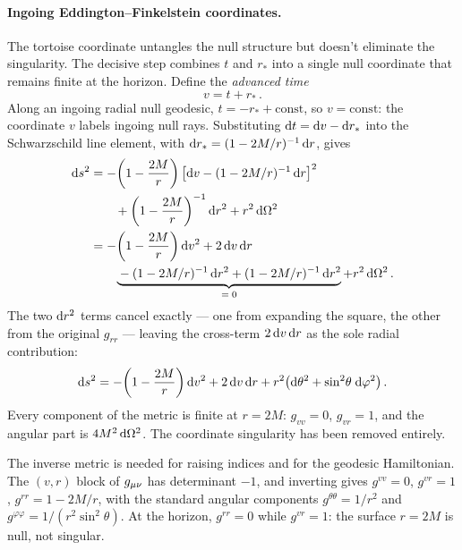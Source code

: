 \paragraph{Ingoing Eddington--Finkelstein coordinates.}

The tortoise coordinate untangles the null structure but doesn't
eliminate the singularity.  The decisive step combines $t$ and $r_*$
into a single null coordinate that remains finite at the horizon.
Define the \emph{advanced time}
%
\begin{equation}
  v = t + r_* \,.
  \label{eq:ef-v-def}
\end{equation}
%
Along an ingoing radial null geodesic, $t = -r_* + \text{const}$, so
$v = \text{const}$: the coordinate $v$ labels ingoing null rays.
Substituting $\mathrm{d} t = \mathrm{d} v - \mathrm{d} r_*$ into the Schwarzschild line
element, with $\mathrm{d} r_* = (1 - 2M/r)^{-1}\,\mathrm{d} r$, gives
%
\begin{align}
  \mathrm{d} s^2 &= -\!\left(1 - \frac{2M}{r}\right)
    \bigl[\mathrm{d} v - (1 - 2M/r)^{-1}\,\mathrm{d} r\bigr]^2
    \notag \\
    &\qquad
    + \left(1 - \frac{2M}{r}\right)^{-1}\mathrm{d} r^2
    + r^2\,\mathrm{d}\Omega^2 \notag \\
  &= -\!\left(1 - \frac{2M}{r}\right)\mathrm{d} v^2
    + 2\,\mathrm{d} v\,\mathrm{d} r \notag \\
    &\qquad
    \underbrace{{}- (1 - 2M/r)^{-1}\,\mathrm{d} r^2
    + (1 - 2M/r)^{-1}\,\mathrm{d} r^2}_{= \; 0}
    + r^2\,\mathrm{d}\Omega^2 \,.
    \label{eq:ef-substitution}
\end{align}
%
The two $\mathrm{d} r^2$ terms cancel exactly --- one from expanding the
square, the other from the original $g_{rr}$ --- leaving the
cross-term $2\,\mathrm{d} v\,\mathrm{d} r$ as the sole radial contribution:
%
\begin{equation}
  \mathrm{d} s^2 = -\!\left(1 - \frac{2M}{r}\right)\mathrm{d} v^2
           + 2\,\mathrm{d} v\,\mathrm{d} r
           + r^2\!\left(\mathrm{d}\theta^2
             + \sin^2\!\theta\;\mathrm{d}\varphi^2\right) .
  \label{eq:ef-ingoing}
\end{equation}
%
Every component of the metric is finite at $r = 2M$: $g_{vv} = 0$,
$g_{vr} = 1$, and the angular part is $4M^2\,\mathrm{d}\Omega^2$.  The
coordinate singularity has been removed entirely.

The inverse metric is needed for raising indices and for the geodesic
Hamiltonian.  The $(v, r)$ block of $g_{\mu\nu}$ has determinant $-1$,
and inverting gives $g^{vv} = 0$, $g^{vr} = 1$,
$g^{rr} = 1 - 2M/r$, with the standard angular components
$g^{\theta\theta} = 1/r^2$ and
$g^{\varphi\varphi} = 1/(r^2\sin^2\!\theta)$.  At the horizon,
$g^{rr} = 0$ while $g^{vr} = 1$: the surface $r = 2M$ is null, not
singular.

